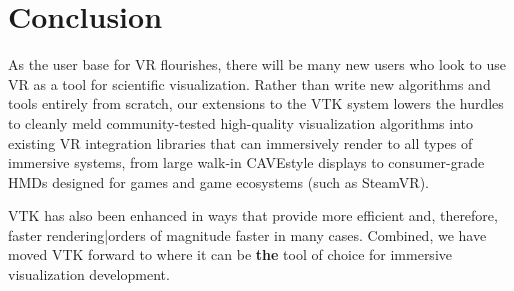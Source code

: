\section{Conclusion}

As the user base for VR flourishes, there will be many
new users who look to use VR as a tool for scientific visualization.
Rather than write new algorithms and tools entirely from scratch,
our extensions to the VTK system lowers the hurdles to cleanly
meld community-tested high-quality visualization algorithms into
existing VR integration libraries that can immersively render to
all types of immersive systems, from large walk-in CAVE\texttrademark\thinspace style displays
to consumer-grade HMDs designed for games and game ecosystems (such
as SteamVR).

VTK has also been enhanced in ways that provide more efficient and,
therefore, faster rendering|orders of magnitude faster in many cases.
Combined, we have moved VTK forward to where it can be \textbf{the}
tool of choice for immersive visualization development.

